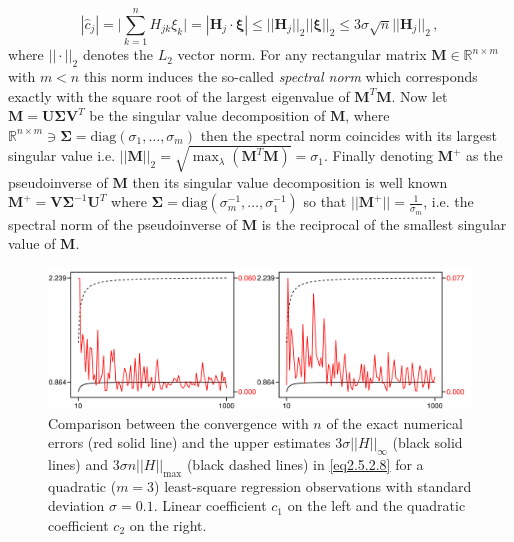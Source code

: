 \documentclass[../main.tex]{subfiles}
\begin{document}
\begin{equation}\label{eq2.5.2.9}
        |\hat{c}_{j}| = \Bigg|\sum_{k=1}^{n}H_{jk}\xi_{k}\Bigg| = |\boldsymbol{H}_{j}\cdot \boldsymbol{\xi}|\leq||\boldsymbol{H}_{j}||_{2}||\boldsymbol{\xi}||_{2}\leq3\sigma\sqrt{n}||\boldsymbol{H}_{j}||_{2}\,,
\end{equation}
where $||\cdot||_{2}$ denotes the $L_{2}$ vector norm.
For any rectangular matrix $\boldsymbol{M}\in \mathbb{R}^{n\times m}$ with $m<n$ this norm induces the so-called \textit{spectral norm} which corresponds exactly with the square root of the largest eigenvalue of $\boldsymbol{M}^{T}\boldsymbol{M}$.
Now let $\boldsymbol{M}=\boldsymbol{U}\boldsymbol{\Sigma}\boldsymbol{V}^{T}$ be the singular value decomposition of $\boldsymbol{M}$, where $\mathbb{R}^{n\times m}\ni\boldsymbol{\Sigma} = \text{diag}(\sigma_{1},\dots,\sigma_{m})$ then the spectral norm coincides with its largest singular value i.e. $||\boldsymbol{M}||_{2}=\sqrt{\max_{\lambda}(\boldsymbol{M}^{T}\boldsymbol{M})} = \sigma_{1}$.
Finally denoting $\boldsymbol{M}^{+}$ as the pseudoinverse of $\boldsymbol{M}$ then its singular value decomposition is well known $\boldsymbol{M}^{+} = \boldsymbol{V}\boldsymbol{\Sigma}^{-1}\boldsymbol{U}^{T}$ where $\boldsymbol{\Sigma} = \text{diag}(\sigma_{m}^{-1},\dots,\sigma_{1}^{-1})$ so that $||\boldsymbol{M}^{+}||=\frac{1}{\sigma_{m}}$, i.e. the spectral norm of the pseudoinverse of $\boldsymbol{M}$ is the reciprocal of the smallest singular value of $\boldsymbol{M}$.
\begin{figure}[H]
    \centering 
    \includegraphics[keepaspectratio, width=\textwidth]{../figures/fig2.5.2.2.png}
    \caption{Comparison between the convergence with $n$ of the exact numerical errors (red solid line) and the upper estimates $3\sigma||H||_{\infty}$ (black solid lines) and $3\sigma n ||H||_{\text{max}}$ (black dashed lines) in \eqref{eq2.5.2.8} for a quadratic ($m=3$) least-square regression observations with standard deviation $\sigma=0.1$. 
    Linear coefficient $c_{1}$ on the left and the quadratic coefficient $c_{2}$ on the right.}
    \label{fig2.5.2.2}
\end{figure}
\end{document}
